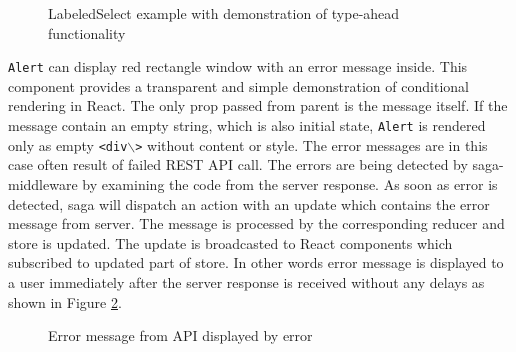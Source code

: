 \begin{figure}[h]
\caption{LabeledSelect example with demonstration of type-ahead functionality}
\label{labelledSelect}
\end{figure} 

\texttt{Alert} can display red rectangle window with an error message inside. This component provides a transparent and simple demonstration of conditional rendering in React. The only prop passed from parent is the message itself. If the message contain an empty string, which is also initial state, \texttt{Alert} is rendered only as empty \texttt{<div$\backslash$>} without content or style. 
The error messages are in this case often result of failed REST API call. The errors are being detected by saga-middleware by examining the code from the server response. As soon as error is detected, saga will dispatch an action with an update which contains the error message from server. The message is processed by the corresponding reducer and store is updated. The update is broadcasted to React components which subscribed to updated part of store. In other words error message is displayed to a user immediately after the server response is received without any delays as shown in Figure \ref{alert}.

\begin{figure}[h]
\caption{Error message from API displayed by error}
\label{alert}
\end{figure}

